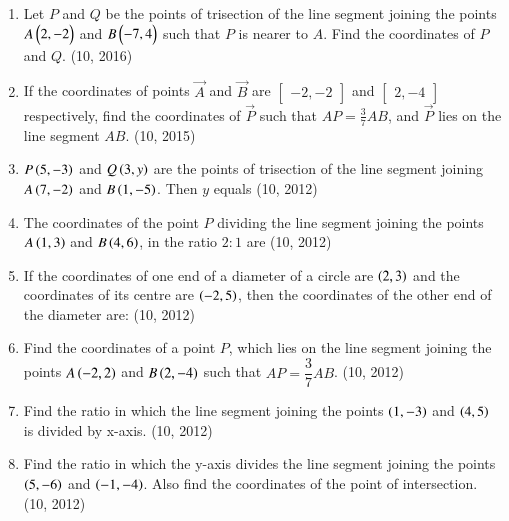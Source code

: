 \begin{enumerate}[label=\thesubsection.\arabic*,ref=\thesubsection.\theenumi]
    \item Let $P$ and $Q$ be the points of trisection of the line segment joining the points $A \begin{pmatrix}2,-2\end{pmatrix}$ and $B \begin{pmatrix}-7, 4\end{pmatrix}$ such that $P$ is nearer to $A$. Find the coordinates of $P$ and $Q$. \hfill (10, 2016)
\item If the coordinates of points $\vec{A}$ and $\vec{B}$ are $\begin{bmatrix}-2, -2\end{bmatrix}$ and $\begin{bmatrix}2, -4\end{bmatrix}$ respectively, find the coordinates of $\vec{P}$ such that $AP = \frac{3}{7} AB$, and $\vec{P}$ lies on the line segment $AB$. \hfill (10, 2015)
\item  $P\left(5,-3\right)$ and $Q\left(3,y\right)$ are the points of trisection of the line segment joining $A\left(7,-2\right)$ and $B\left(1,-5\right)$. Then $y$ equals
\hfill (10, 2012)
\item The coordinates of the point $P$ dividing the line segment joining the points $A\left(1,3\right)$ and $B\left(4,6\right)$, in the ratio $2:1$ are
\hfill (10, 2012)
\item If the coordinates of one end of a diameter of a circle are $\left(2,3\right)$ and the coordinates of its centre are $\left(-2,5\right)$, then the coordinates of the other end of the diameter are:
\hfill (10, 2012)
\item Find the coordinates of a point $P$, which lies on the line segment joining the points $A\left(-2,2\right)$ and $B\left(2,-4\right)$ such that $AP = \dfrac{3}{7} AB$. 
\hfill (10, 2012)
\item Find the ratio in which the line segment joining the points $\left(1,-3\right)$ and $\left(4,5\right)$ is divided by x-axis. 
\hfill (10, 2012)
\item Find the ratio in which the y-axis divides the line segment joining the points $\left(5,-6\right)$ and $\left(-1,-4\right)$. Also find the coordinates of the point of intersection. 
\hfill (10, 2012)
\end{enumerate}
